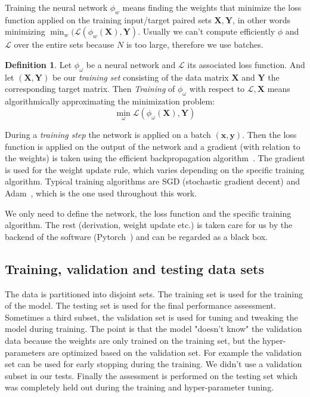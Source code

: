 \documentclass[11pt, a4paper]{report}
\theoremstyle{plain}
\theoremstyle{definition}
\newtheorem{mydef}{Definition}[chapter]
\theoremstyle{remark}
\newcommand{\X}{\mathbf{X}}
\newcommand{\x}{\mathbf{x}}
\newcommand{\Y}{\mathbf{Y}}
\newcommand{\y}{\mathbf{y}}
\begin{document}
Training the neural network $\phi_w$ means finding the weights that minimize the
loss function applied on the training input/target paired sets $\X,\Y$, in other
words minimizing $\min_{w} (\mathcal{L}(\phi_w(\X),\Y)$.
Usually we can't compute efficiently $\phi$ and $\mathcal{L}$ over the entire
sets because $N$ is too large, therefore we use batches.

\begin{mydef}
Let $\phi_{\omega}$ be a neural network and $\mathcal{L}$ its associated loss
function. And let $(\X, \Y)$ be our \emph{training set} consisting of 
the data matrix $\X$ and $\Y$
the corresponding target matrix.
Then \emph{Training} of $\phi_{\omega}$ with respect to $\mathcal{L}, \X$ 
means
algorithmically approximating the minimization problem:
\begin{equation}
\label{def:training}
\min_{\omega} \mathcal{L}(\phi_{\omega}(\X), \Y)
\end{equation}
\end{mydef}

During a \emph{training step} the network is applied on a batch $(\x,\y)$. Then the
loss function is applied on the output of the network and a gradient (with relation to the
weights) is taken using the efficient backpropagation
algorithm~\cite{nielsen2015neural}.
The gradient is used for the weight update rule, which
varies depending on the specific training algorithm. Typical training algorithms
are SGD (stochastic gradient decent) and Adam~\cite{jais2019adam},
which is the one used throughout
this work.

We only need to define the network, the loss function and the specific training
algorithm. The rest (derivation, weight update etc.) is taken care for us by the
backend of the software (Pytorch~\cite{pytorch2018pytorch}) and can be regarded
as a black box.

\subsection{Training, validation and testing data sets}

The data is partitioned into disjoint sets. The training set is used for the
training of the model. The testing set is used for the final performance
assessment. Sometimes a third subset, the validation set is used for tuning and
tweaking the model during training. The point is that the model "doesn't know"
the validation data because the weights are only trained on the training set,
but the hyper-parameters are optimized based on the validation set.
For example the validation set can be used for early
stopping during the training.
We didn't use a validation subset in our tests.
Finally the assessment is performed on the 
testing set which was completely held out during the training and
hyper-parameter tuning.
\end{document}
